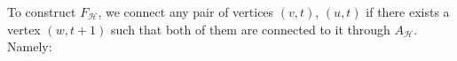 \begin{definition}
\begin{enumerate}
\begin{enumerate}
        \end{enumerate}
            To construct $F_{\mathcal{H}}$, we connect any pair of vertices $(v,t)$, $(u,t)$ if there exists a vertex $(w,t+1)$ such that both of them are connected to it through $A_{\mathcal{H}}$. Namely: 

\end{enumerate}
\end{definition}

